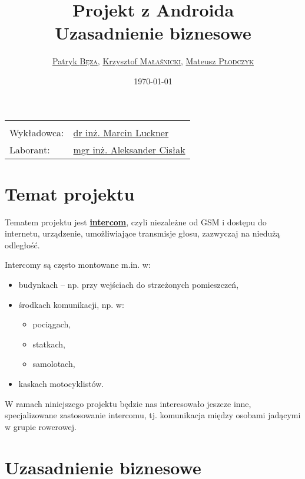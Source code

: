 \documentclass{article}
\title{Projekt z Androida\\Uzasadnienie biznesowe}
\author{\href{mailto:bezap@student.mini.pw.edu.pl}{Patryk \textsc{Bęza}}, \href{mailto:malasnickik@student.mini.pw.edu.pl}{Krzysztof \textsc{Małaśnicki}}, \href{mailto:plodczykm@student.mini.pw.edu.pl}{Mateusz \textsc{Płodczyk}}}
\date{\today}
\begin{document}
\maketitle

\begin{center}
\begin{tabular}{ll}
\date\\
Wykładowca: & \href{mailto:mluckner@mini.pw.edu.pl}{dr inż. Marcin Luckner}\\
Laborant: & \href{mailto:a.cislak@mini.pw.edu.pl}{mgr inż. Aleksander Cisłak}
\end{tabular}
\end{center}



\section{Temat projektu}
\label{temat_projektu}

Tematem projektu jest \href{https://en.wikipedia.org/wiki/Intercom}{\textbf{intercom}}, czyli niezależne od GSM i dostępu do internetu, urządzenie, umożliwiające transmisje głosu, zazwyczaj na niedużą odległość.

Intercomy są często montowane m.in. w:
\begin{itemize}
\item budynkach -- np. przy wejściach do strzeżonych pomieszczeń,
\item środkach komunikacji, np. w:
	\begin{itemize}
		\item pociągach,
		\item statkach,
		\item samolotach,
	\end{itemize}
\item kaskach motocyklistów.
\end{itemize}

W ramach niniejszego projektu będzie nas interesowało jeszcze inne, specjalizowane zastosowanie intercomu, tj. komunikacja między osobami jadącymi w grupie rowerowej.


\section{Uzasadnienie biznesowe}
\end{document}
